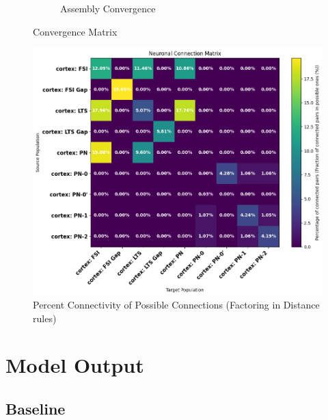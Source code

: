 \documentclass[12pt, letterpaper]{article}
\begin{document}
\begin{figure}[H]
\begin{subfigure}{.5\textwidth}
      \caption{Assembly Convergence}
      \label{fig:sub3}
    \end{subfigure}
    \caption{Convergence Matrix}
    \label{fig:test}
\end{figure}

\begin{figure}[H]
    \centering
    \includegraphics[width=\textwidth]{connections/percent-connections}
    \caption{Percent Connectivity of Possible Connections (Factoring in Distance rules)}
    \label{fig:percentconns}
\end{figure}

\section*{Model Output}

\subsection*{Baseline}
\end{document}
